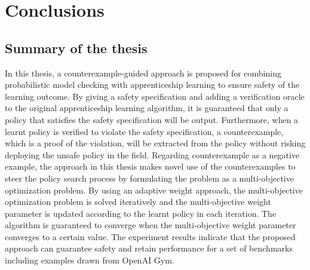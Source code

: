 \chapter{Conclusions}
\label{chapter:Conclusions}
\thispagestyle{myheadings}

\graphicspath{{3_Conclusion/Figures/}}

\section{Summary of the thesis}
In this thesis, a counterexample-guided approach is proposed for combining probabilistic model checking with apprenticeship learning to ensure safety of the learning outcome. By giving a safety specification and adding a verification oracle to the original apprenticeship learning algorithm, it is guaranteed that only a policy that satisfies the safety specification will be output. Furthermore, when a learnt policy is verified to violate the safety specification, a counterexample, which is a proof of the violation, will be extracted from the policy without risking deploying the unsafe policy in the field. Regarding counterexample as a negative example, the approach in this thesis makes novel use of the counterexamples to steer the policy search process by formulating the problem as a multi-objective optimization problem. By using an adaptive weight approach, the multi-objective optimization problem is solved iteratively and the multi-objective weight parameter is updated according to the learnt policy in each iteration. The algorithm is guaranteed to converge when the multi-objective weight parameter converges to a certain value. The experiment results indicate that the proposed approach can guarantee safety and retain performance for a set of benchmarks including examples drawn from OpenAI Gym.


